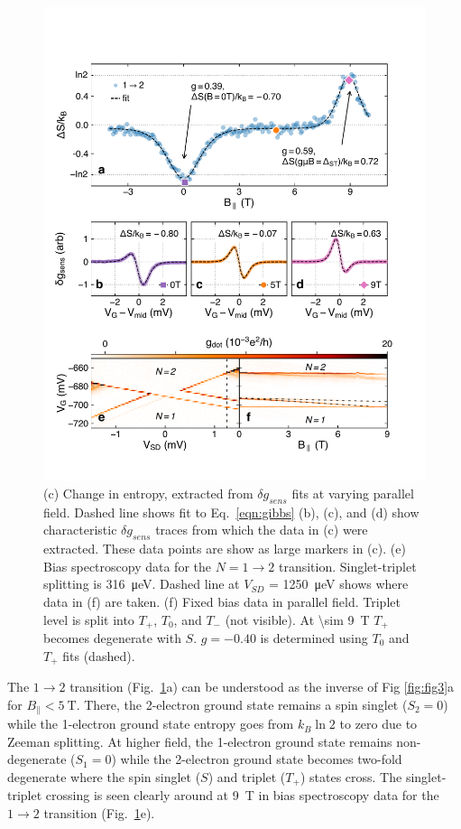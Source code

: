 \documentclass[twocolumn,showpacs,amsmath,amssymb,prl,aps,superscriptaddress]{revtex4-1}
\begin{document}
\begin{figure}
        \includegraphics[width=1.0\columnwidth]{../figures/figure_4.pdf}
        \caption{\label{fig:fig4}(c) Change in entropy, extracted from $\delta g_{sens}$ fits at varying parallel field. Dashed line shows fit to Eq.~\ref{eqn:gibbs} (b), (c), and (d) show characteristic $\delta g_{sens}$ traces from which the data in (c) were extracted. These data points are show as large markers in (c). (e) Bias spectroscopy data for the $N=1 \rightarrow 2$ transition. Singlet-triplet splitting is \SI{316}{\micro\electronvolt}. Dashed line at $V_{SD}$ = \SI{1250}{\micro\electronvolt} shows where data in (f) are taken. (f) Fixed bias data in parallel field. Triplet level is split into $T_+$, $T_0$, and $T_{-}$ (not visible). At \SI[input-protect-tokens]{\sim 9}{\tesla} $T_+$ becomes degenerate with $S$. $g=-0.40$ is determined using $T_0$ and $T_+$ fits (dashed).}
\end{figure}

The $1\rightarrow 2$ transition (Fig.~\ref{fig:fig4}a) can be understood as the inverse of Fig \ref{fig:fig3}a for $B_\parallel < \SI{5}{\tesla}$.  There, the 2-electron ground state remains a spin singlet ($S_2=0$) while the 1-electron ground state entropy goes from $k_B\ln{2}$ to zero due to Zeeman splitting. At higher field, the 1-electron ground state remains non-degenerate ($S_1=0$) while the 2-electron ground state becomes two-fold degenerate where the spin singlet ($S$) and triplet ($T_+$) states cross. The singlet-triplet crossing is seen clearly around at \SI{9}{\tesla} in bias spectroscopy data for the $1\rightarrow 2$ transition (Fig.~\ref{fig:fig4}e). 
\end{document}
